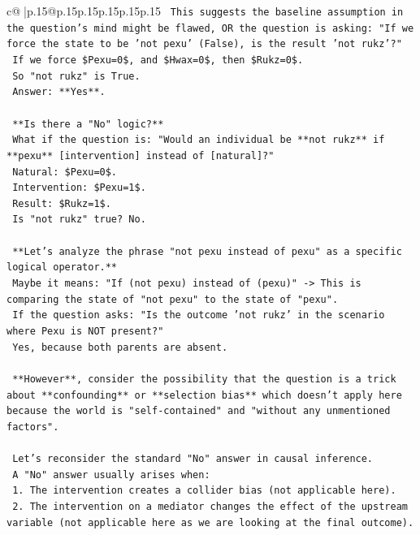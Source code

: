 \documentclass{article}
\begin{document}
{\begin{supertabular}{c@{$\;$}|p{.15\linewidth}@{}p{.15\linewidth}p{.15\linewidth}p{.15\linewidth}p{.15\linewidth}p{.15\linewidth}}
{{{\texttt{        This suggests the baseline assumption in the question's mind might be flawed, OR the question is asking: "If we force the state to be 'not pexu' (False), is the result 'not rukz'?"} \\
\texttt{        If we force \$Pexu=0\$, and \$Hwax=0\$, then \$Rukz=0\$.} \\
\texttt{        So "not rukz" is True.} \\
\texttt{        Answer: **Yes**.} \\
\\ 
\texttt{        **Is there a "No" logic?**} \\
\texttt{        What if the question is: "Would an individual be **not rukz** if **pexu** {[}intervention{]} instead of {[}natural{]}?"} \\
\texttt{        Natural: \$Pexu=0\$.} \\
\texttt{        Intervention: \$Pexu=1\$.} \\
\texttt{        Result: \$Rukz=1\$.} \\
\texttt{        Is "not rukz" true? No.} \\
\\ 
\texttt{        **Let's analyze the phrase "not pexu instead of pexu" as a specific logical operator.**} \\
\texttt{        Maybe it means: "If (not pexu) instead of (pexu)" {-}> This is comparing the state of "not pexu" to the state of "pexu".} \\
\texttt{        If the question asks: "Is the outcome 'not rukz' in the scenario where Pexu is NOT present?"} \\
\texttt{        Yes, because both parents are absent.} \\
\\ 
\texttt{        **However**, consider the possibility that the question is a trick about **confounding** or **selection bias** which doesn't apply here because the world is "self{-}contained" and "without any unmentioned factors".} \\
\\ 
\texttt{        Let's reconsider the standard "No" answer in causal inference.} \\
\texttt{        A "No" answer usually arises when:} \\
\texttt{        1. The intervention creates a collider bias (not applicable here).} \\
\texttt{        2. The intervention on a mediator changes the effect of the upstream variable (not applicable here as we are looking at the final outcome).} \\
}}}
\end{supertabular}}
\end{document}
